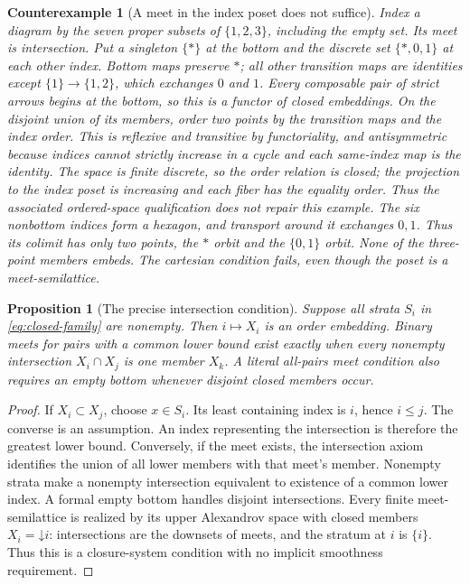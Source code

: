 \documentclass[11pt,a4paper]{article}
\newtheorem{proposition}[theorem]{Proposition}
\newtheorem{counterexample}[theorem]{Counterexample}
\theoremstyle{definition}
\begin{document}
\begin{counterexample}[A meet in the index poset does not suffice]\label{ex:closed-meet}
Index a diagram by the seven proper subsets of $\{1,2,3\}$, including
the empty set. Its meet is intersection. Put a singleton $\{*\}$ at
the bottom and the discrete set $\{*,0,1\}$ at each other index.
Bottom maps preserve $*$; all other transition maps are identities
except $\{1\}\to\{1,2\}$, which exchanges $0$ and $1$.
Every composable pair of strict arrows begins at the bottom, so this
is a functor of closed embeddings. On the disjoint union of its members,
order two points by the transition maps and the index order. This is
reflexive and transitive by functoriality, and antisymmetric because
indices cannot strictly increase in a cycle and each same-index map
is the identity. The space is finite discrete, so the order relation
is closed; the projection to the index poset is increasing and each
fiber has the equality order. Thus the associated ordered-space
qualification does not repair this example. The six nonbottom indices form a
hexagon, and transport around it exchanges $0,1$. Thus its colimit
has only two points, the $*$ orbit and the $\{0,1\}$ orbit. None of
the three-point members embeds. The cartesian condition fails, even
though the poset is a meet-semilattice.
\end{counterexample}

\begin{proposition}[The precise intersection condition]\label{prop:meet-intersection}
Suppose all strata $S_i$ in \eqref{eq:closed-family} are nonempty.
Then $i\mapsto X_i$ is an order embedding. Binary meets for pairs with
a common lower bound exist exactly when every nonempty intersection
$X_i\cap X_j$ is one member $X_k$. A literal all-pairs meet condition
also requires an empty bottom whenever disjoint closed members occur.
\end{proposition}
\begin{proof}
If $X_i\subset X_j$, choose $x\in S_i$. Its least containing index
is $i$, hence $i\leq j$. The converse is an assumption. An index
representing the intersection is therefore the greatest lower bound.
Conversely, if the meet exists, the intersection axiom identifies the
union of all lower members with that meet's member. Nonempty strata
make a nonempty intersection equivalent to existence of a common
lower index. A formal empty bottom handles disjoint intersections. Every finite meet-semilattice is realized by its upper Alexandrov space with closed members $X_i=\mathord\downarrow i$: intersections are the downsets of meets, and the stratum at $i$ is $\{i\}$. Thus this is a closure-system condition with no implicit smoothness requirement.
\end{proof}
\end{document}
